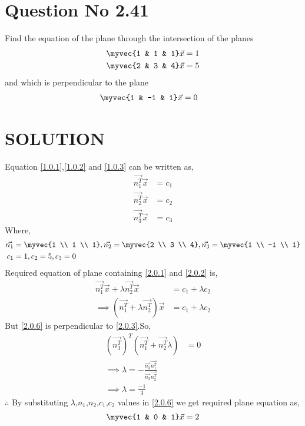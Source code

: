 \documentclass[journal,12pt,twocolumn]{IEEEtran}
\begin{document}
\section{Question No 2.41}
Find the equation of the plane through the   intersection of the planes 
%
\begin{align}
\myvec{1 & 1 & 1}\vec{x}&=1 \label{1.0.1}
\\
\myvec{2 & 3 & 4}\vec{x}&=5 \label{1.0.2}
\end{align}
%
and which is perpendicular to the plane 
\begin{align}
\myvec{1 & -1 & 1}\vec{x}&=0 \label{1.0.3}
\end{align} 
\section{SOLUTION} 
Equation \eqref{1.0.1},\eqref{1.0.2} and \eqref{1.0.3} can be written as,
\begin{align}
\vec{n_1^T}\vec{x} &= c_1 \label{2.0.1}\\
\vec{n_2^T}\vec{x} &= c_2 \label{2.0.2}\\
\vec{n_3^T}\vec{x} &= c_3 \label{2.0.3}
\end{align}
Where,
\begin{align}
\vec{n_1}&=\myvec{1 \\ 1 \\ 1},\vec{n_2}=\myvec{2 \\ 3 \\ 4},\vec{n_3}=\myvec{1 \\ -1 \\ 1}\nonumber \\
c_1&=1,c_2=5,c_3=0
\end{align}
Required equation of plane containing \eqref{2.0.1} and \eqref{2.0.2} is,
\begin{align}
\vec{n_1^T}\vec{x} + \lambda\vec{n_2^T}\vec{x}  &= c_1+\lambda c_2  \\
\implies (\vec{n_1^T}+\lambda\vec{n_2^T})\vec{x} &= c_1+\lambda c_2  \label{2.0.6}
\end{align}
But \eqref{2.0.6} is perpendicular to \eqref{2.0.3}.So,
\begin{align}
(\vec{n_3^T})^T(\vec{n_1^T}+\vec{n_2^T} \lambda)&=0\\
\implies \lambda = -\frac{\vec{n_3}\vec{n_1^T}}{\vec{n_3}\vec{n_2^T}}\\
\implies\lambda = \frac{-1}{3}
\end{align}
$\therefore $ By substituting $\lambda$,$n_1$,$n_2$,$c_1$,$c_2$ values in \eqref{2.0.6} we get required plane equation as,
\begin{align}
\myvec{1 & 0 & 1}\vec{x} = 2
\end{align}
\end{document}
